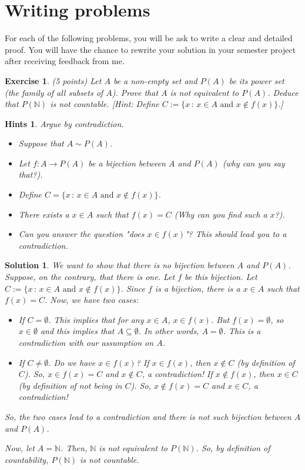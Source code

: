 \documentclass[12pt]{article}
\newcommand{\bN}{\mathbb{N}}
\newcommand{\ra}{\rightarrow}
\theoremstyle{plain}
\newtheorem{exer}{\textbf{Exercise}}}
\theoremstyle{plain}
\theoremstyle{plain}
\newtheorem*{solWP}{\textbf{Solution}}}
\theoremstyle{plain}
\newtheorem*{hint}{\textbf{Hints}}}
\begin{document}
\section{Writing problems}
For each of the following problems, you will be ask to write a clear and detailed proof. You will have the chance to rewrite your solution in your semester project after receiving feedback from me.

\begin{exer}
(5 points)
Let $A$ be a non-empty set and $P(A)$ be its power set (the family of all subsets of $A$). Prove that $A$ is not equivalent to $P(A)$. Deduce that $P (\bN )$ is not countable. [Hint: Define $C := \{ x \,  :\, x \in A \text{ and } x \not\in f(x) \}$.]
\end{exer}
\begin{hint}
Argue by contradiction.	
	\begin{itemize}
	\item Suppose that $A \sim P (A)$. 
	\item Let $f : A \ra P (A)$ be a bijection between $A$ and $P(A)$ (why can you say that?).
	\item Define $C = \{ x \, : \, x \in A \text{ and } x \not\in f(x) \}$.
	\item There exists a $x \in A$ such that $f(x) = C$ (Why can you find such a $x$?).
	\item Can you answer the question "does $x \in f(x)$"? This should lead you to a contradiction.
	\end{itemize}
\end{hint}
\begin{solWP}
We want to show that there is no bijection between $A$ and $P(A)$. Suppose, on the contrary, that there is one. Let $f$ be this bijection. Let $C := \{ x \, : \, x \in A \text{ and } x \not\in f(x) \}$. Since $f$ is a bijection, there is a $x \in A$ such that $f(x) = C$. Now, we have two cases:
	\begin{itemize}
	\item If $C = \emptyset$. This implies that for any $x \in A$, $x \in f(x)$. But $f(x) = \emptyset$, so $x \in \emptyset$ and this implies that $A \subseteq \emptyset$. In other words, $A = \emptyset$. This is a contradiction with our assumption on $A$.
	\item If $C \neq \emptyset$. Do we have $x \in f(x)$? If $x \in f(x)$, then $x \not\in C$ (by definition of $C$). So, $x \in f(x) = C$ and $x \not\in C$, a contradiction! If $x \not\in f(x)$, then $x \in C$ (by definition of not being in $C$). So, $x \not\in f(x) = C$ and $x \in C$, a contradiction!
	\end{itemize}
So, the two cases lead to a contradiction and there is not such bijection between $A$ and $P(A)$.

Now, let $A = \bN$. Then, $\bN$ is not equivalent to $P (\bN )$. So, by definition of countability, $P (\bN )$ is not countable.
\end{solWP}
\end{document}
